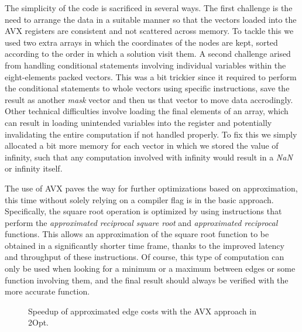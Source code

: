 The simplicity of the code is sacrificed in several ways.
The first challenge is the need to arrange the data in a suitable manner so that the vectors loaded into the AVX registers are consistent and not scattered across memory.
To tackle this we used two extra arrays in which the coordinates of the nodes are kept, sorted according to the order in which a solution visit them.
A second challenge arised from handling conditional statements involving individual variables within the eight-elements packed vectors.
This was a bit trickier since it required to perform the conditional statements to whole vectors using specific instructions, save the result as another \textit{mask} vector and then us that vector to move data accrodingly.
Other technical difficulties involve loading the final elements of an array, which can result in loading unintended variables into the register and potentially invalidating the entire computation if not handled properly.
To fix this we simply allocated a bit more memory for each vector in which we stored the value of infinity, such that any computation involved with infinity would result in a \textit{NaN} or infinity itself.

The use of AVX paves the way for further optimizations based on approximation, this time without solely relying on a compiler flag is in the basic approach.
Specifically, the square root operation is optimized by using instructions that perform the \textit{approximated reciprocal square root} and \textit{approximated reciprocal} functions.
This allows an approximation of the square root function to be obtained in a significantly shorter time frame, thanks to the improved latency and throughput of these instructions.
Of course, this type of computation can only be used when looking for a minimum or a maximum between edges or some function involving them, and the final result should always be verified with the more accurate function.

\begin{figure}[htbp]
    \centering
    \caption{Speedup of approximated edge costs with the AVX approach in 2Opt.} \label{fig:avxApprox}
\end{figure}

